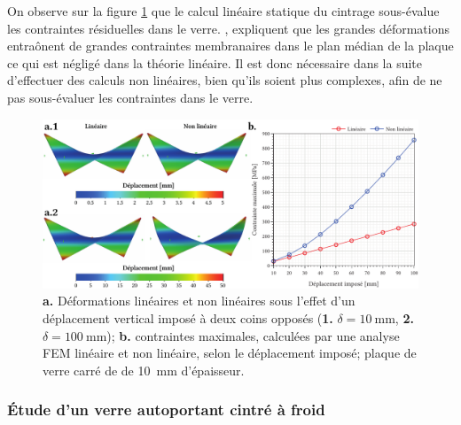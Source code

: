 \documentclass[11pt,titlepage]{article}
\begin{document}
On observe sur la figure \ref{fig:non_linear_cintr2} que le calcul linéaire statique du cintrage sous-évalue les contraintes résiduelles dans le verre. \Textcite{buckling_cold}, expliquent que les grandes déformations entraônent de grandes contraintes membranaires dans le plan médian de la plaque ce qui est négligé dans la théorie linéaire. Il est donc nécessaire dans la suite d'effectuer des calculs non linéaires, bien qu'ils soient plus complexes, afin de ne pas sous-évaluer les contraintes dans le verre. 
\begin{figure}[H]
    \includegraphics[width=\linewidth]{img/cintrage_froid/non_linear2.pdf}
       \caption{\textbf{a.} Déformations linéaires et non linéaires sous l'effet d'un déplacement vertical imposé à deux coins opposés (\textbf{1.} $\delta = \qty{10}{\milli\metre}$, \textbf{2.} $\delta = \qty{100}{\milli\metre}$); \textbf{b.} contraintes maximales, calculées par une analyse FEM linéaire et non linéaire, selon le déplacement imposé; plaque de verre carré de  de \qty{10}{\milli\metre} d'épaisseur.}
   \label{fig:non_linear_cintr2}
   \end{figure}
\subsubsection{Étude d'un verre autoportant cintré à froid}
\end{document}
